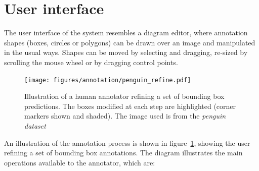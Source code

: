 \section {User interface}
\label{sec:user_interface}
 
The user interface of the system resembles a diagram editor, where annotation shapes (boxes, circles or polygons) can be drawn over an image and manipulated in the usual ways. Shapes can be moved by selecting and dragging, re-sized by scrolling the mouse wheel or by dragging control points. 

\begin{figure}[h!]
  \centering
  \texttt{[image: figures/annotation/penguin\_refine.pdf]}
  \caption{Illustration of a human annotator refining a set of bounding box predictions. The boxes modified at each step are highlighted (corner markers shown and shaded). The image used is from the \emph{penguin dataset} \cite{PenguinData} }   
  \label{fig:penguin_refinement}
\end{figure}

An illustration of the annotation process is shown in figure~\ref{fig:penguin_refinement}, showing the user refining a set of bounding box annotations. The diagram illustrates the main operations available to the annotator, which are:

